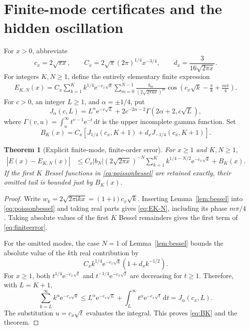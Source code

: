 \documentclass[11pt,a4paper]{article}
\newtheorem{theorem}{Theorem}[section]
\theoremstyle{definition}
\theoremstyle{remark}
\newcommand{\dd}{\,\mathrm d}
\newcommand{\e}{\mathrm e}
\newcommand{\ii}{\mathrm i}
\numberwithin{equation}{section}
\begin{document}
\section{Finite-mode certificates and the hidden oscillation}\label{sec:bounds}
For $x>0$, abbreviate
\begin{equation}\label{eq:scales}
 c_x=2\sqrt{\pi x},\qquad
 C_x=2\sqrt\pi(2\pi)^{1/4}x^{-3/4},\qquad
 d_x=\frac3{16\sqrt{2\pi x}}.
\end{equation}
For integers $K,N\ge1$, define the entirely elementary finite expression
\begin{align}\label{eq:EK-N}
 E_{K,N}(x)=C_x\sum_{k=1}^{K}k^{1/4}\e^{-c_x\sqrt k}
 \sum_{m=0}^{N-1}
 \frac{b_m}{(2\sqrt{2\pi kx})^m}
 \cos\left(c_x\sqrt k-\frac\pi8+\frac{m\pi}4\right).
\end{align}
For $c>0$, an integer $L\ge1$, and $\alpha=\pm1/4$, put
\begin{equation}\label{eq:Jalpha}
 J_\alpha(c,L)=L^\alpha\e^{-c\sqrt L}
 +2c^{-2\alpha-2}\Gamma(2\alpha+2,c\sqrt L),
\end{equation}
where $\Gamma(v,u)=\int_u^\infty t^{v-1}\e^{-t}\dd t$ is the upper incomplete gamma function. Set
\begin{equation}\label{eq:BK}
 B_K(x)=C_x\left[J_{1/4}(c_x,K+1)+d_xJ_{-1/4}(c_x,K+1)\right].
\end{equation}

\begin{theorem}[Explicit finite-mode, finite-order error]\label{thm:finiteerror}
For $x\ge1$ and $K,N\ge1$,
\begin{align}\label{eq:finiteerror}
 |E(x)-E_{K,N}(x)|
 &\le C_x |b_N|(2\sqrt{2\pi x})^{-N}
       \sum_{k=1}^{K}k^{1/4-N/2}\e^{-c_x\sqrt k}
       +B_K(x).
\end{align}
If the first $K$ Bessel functions in \eqref{eq:poissonbessel} are retained exactly, their omitted tail is bounded just by $B_K(x)$.
\end{theorem}
\begin{proof}
Write $w_k=2\sqrt{2\pi\ii kx}=(1+\ii)c_x\sqrt k$. Inserting Lemma~\ref{lem:bessel} into \eqref{eq:poissonbessel} and taking real parts gives \eqref{eq:EK-N}, including its phase $m\pi/4$. Taking absolute values of the first $K$ Bessel remainders gives the first term of \eqref{eq:finiteerror}.

For the omitted modes, the case $N=1$ of Lemma~\ref{lem:bessel} bounds the absolute value of the $k$th real contribution by
\[
 C_x k^{1/4}\e^{-c_x\sqrt k}
       (1+d_x k^{-1/2}).
\]
For $x\ge1$, both $t^{1/4}\e^{-c_x\sqrt t}$ and $t^{-1/4}\e^{-c_x\sqrt t}$ are decreasing for $t\ge1$. Therefore, with $L=K+1$,
\[
 \sum_{k=L}^\infty k^\alpha\e^{-c_x\sqrt k}
 \le L^\alpha\e^{-c_x\sqrt L}+
       \int_L^\infty t^\alpha\e^{-c_x\sqrt t}\dd t
 =J_\alpha(c_x,L).
\]
The substitution $u=c_x\sqrt t$ evaluates the integral. This proves \eqref{eq:BK} and the theorem.
\end{proof}
\end{document}
